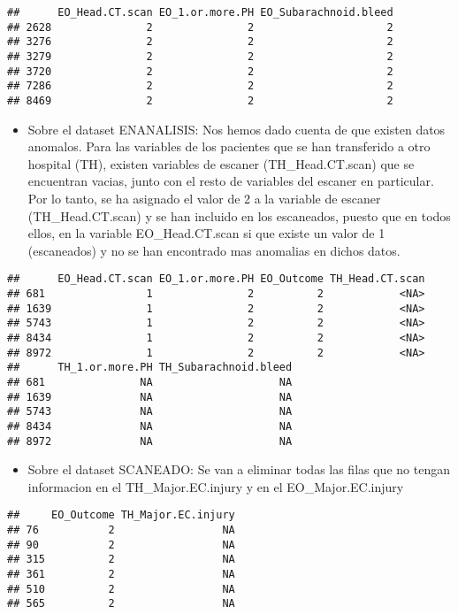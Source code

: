 \documentclass[]{article}
\providecommand{\tightlist}{%
  \setlength{\itemsep}{0pt}\setlength{\parskip}{0pt}}
\begin{document}
\begin{verbatim}
##      EO_Head.CT.scan EO_1.or.more.PH EO_Subarachnoid.bleed
## 2628               2               2                     2
## 3276               2               2                     2
## 3279               2               2                     2
## 3720               2               2                     2
## 7286               2               2                     2
## 8469               2               2                     2
\end{verbatim}

\begin{itemize}
\tightlist
\item
  Sobre el dataset ENANALISIS: Nos hemos dado cuenta de que existen
  datos anomalos. Para las variables de los pacientes que se han
  transferido a otro hospital (TH), existen variables de escaner
  (TH\_Head.CT.scan) que se encuentran vacias, junto con el resto de
  variables del escaner en particular. Por lo tanto, se ha asignado el
  valor de 2 a la variable de escaner (TH\_Head.CT.scan) y se han
  incluido en los escaneados, puesto que en todos ellos, en la variable
  EO\_Head.CT.scan si que existe un valor de 1 (escaneados) y no se han
  encontrado mas anomalias en dichos datos.
\end{itemize}

\begin{verbatim}
##      EO_Head.CT.scan EO_1.or.more.PH EO_Outcome TH_Head.CT.scan
## 681                1               2          2            <NA>
## 1639               1               2          2            <NA>
## 5743               1               2          2            <NA>
## 8434               1               2          2            <NA>
## 8972               1               2          2            <NA>
##      TH_1.or.more.PH TH_Subarachnoid.bleed
## 681               NA                    NA
## 1639              NA                    NA
## 5743              NA                    NA
## 8434              NA                    NA
## 8972              NA                    NA
\end{verbatim}

\begin{itemize}
\tightlist
\item
  Sobre el dataset SCANEADO: Se van a eliminar todas las filas que no
  tengan informacion en el TH\_Major.EC.injury y en el
  EO\_Major.EC.injury
\end{itemize}

\begin{verbatim}
##     EO_Outcome TH_Major.EC.injury
## 76           2                 NA
## 90           2                 NA
## 315          2                 NA
## 361          2                 NA
## 510          2                 NA
## 565          2                 NA
\end{verbatim}
\end{document}
